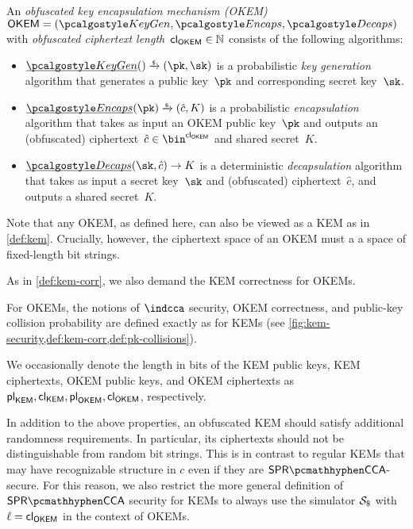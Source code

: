 \begin{definition}
    \label{def:okem}
    An \emph{obfuscated key encapsulation mechanism (OKEM)} $\OKEM = (\kgen, \encaps, \decaps)$ with \emph{obfuscated ciphertext length}~${\mathsf{cl}_{\mathsf{OKEM}}} \in \mathbb{N}$ consists of the following algorithms:
    \begin{itemize}
        \item $\ul{\kgen}() \tor (\pk,\sk)$ is a probabilistic \emph{key generation} algorithm that generates a public key~$\pk$ and corresponding secret key~$\sk$.

        \item $\ul{\encaps}(\pk) \tor (\hat c, K)$ is a probabilistic \emph{encapsulation} algorithm that takes as input an OKEM public key~$\pk$ and outputs an (obfuscated) ciphertext~$\hat c \in \bin^\obfctxtlen$ and shared secret~$K$.

        \item $\ul{\decaps}(\sk,\hat c) \to K$ is a deterministic \emph{decapsulation} algorithm that takes as input a secret key~$\sk$ and (obfuscated) ciphertext~$\hat c$, and outputs a shared secret~$K$.
    \end{itemize}
    Note that any OKEM, as defined here, can also be viewed as a KEM as in \cref{def:kem}. Crucially, however, the ciphertext space of an OKEM must a a space of fixed-length bit strings.

    As in \cref{def:kem-corr}, we also demand the KEM correctness for OKEMs.
\end{definition}

For OKEMs, the notions of $\indcca$ security, OKEM correctness, and public-key collision probability are defined exactly as for KEMs (see \cref{fig:kem-security,def:kem-corr,def:pk-collisions}).

We occasionally denote the length in bits of the KEM public keys, KEM ciphertexts, OKEM public keys, and OKEM ciphertexts as ${\mathsf{pl}_{\mathsf{KEM}}}, {\mathsf{cl}_{\mathsf{KEM}}}, {\mathsf{pl}_{\mathsf{OKEM}}}, {\mathsf{cl}_{\mathsf{OKEM}}}$, respectively.

In addition to the above properties, an obfuscated KEM should satisfy additional randomness requirements. In particular, its ciphertexts should not be distinguishable from random bit strings. This is in contrast to regular KEMs that may have recognizable structure in $c$ even if they are $\sprcca$-secure.
For this reason, we also restrict the more general definition of $\sprcca$ security for KEMs to always use the simulator $\simulbin$ with $\ell = {\mathsf{cl}_{\mathsf{OKEM}}}$ in the context of OKEMs.

